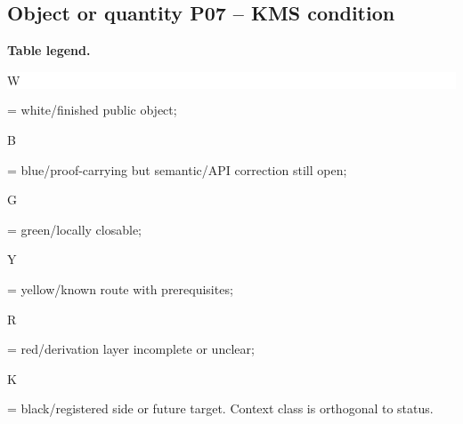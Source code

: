 \subsection*{Object or quantity P07 -- KMS condition}
\hypertarget{objproof:P07}{}
\par\smallskip\noindent\begin{minipage}{0.99\linewidth}\footnotesize\raggedright\textbf{Table legend.} \colorbox{white}{\strut W} = white/finished public object; \colorbox{cyan!20}{\strut B} = blue/proof-carrying but semantic/API correction still open; \colorbox{green!18}{\strut G} = green/locally closable; \colorbox{yellow!25}{\strut Y} = yellow/known route with prerequisites; \colorbox{red!20}{\strut R} = red/derivation layer incomplete or unclear; \colorbox{black!18}{\strut K} = black/registered side or future target. Context class is orthogonal to status.\end{minipage}\par\vspace{0.25em}
